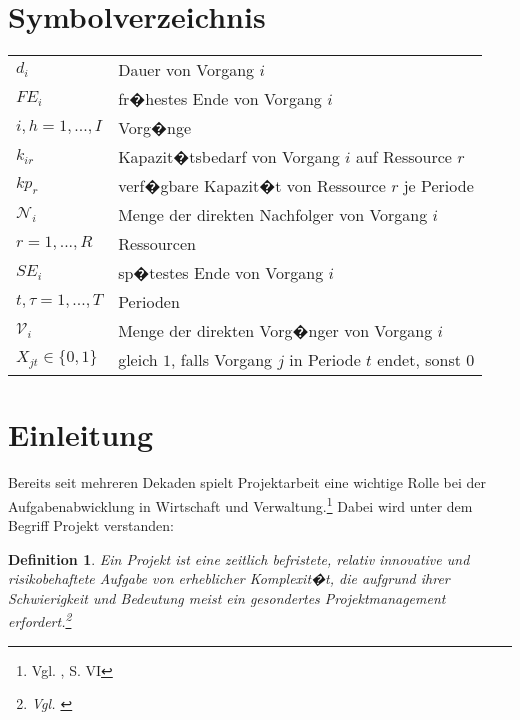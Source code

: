\documentclass[a4paper,12pt,parskip,bibtotoc,liststotoc]{article}
\newtheorem{mydef}{Definition}
\begin{document}
\section*{Symbolverzeichnis}
\begin{table}[h!]
    \vspace*{-3mm}
        \hspace*{2mm}
      \renewcommand{\arraystretch}{1,5}
    \begin{tabular}{ll} 
$d_i$ & Dauer von Vorgang $i$ \\
$FE_i$& fr�hestes Ende von Vorgang $i$\\
$i,h=1,...,I$ & Vorg�nge \\
$k_{ir}$& Kapazit�tsbedarf von Vorgang $i$ auf Ressource $r$\\
$kp_r$ & verf�gbare Kapazit�t von Ressource $r$ je Periode\\
$\mathcal{N}_i$ & Menge der direkten Nachfolger von Vorgang $i$ \\
$r=1,...,R$ & Ressourcen \\
$SE_i$& sp�testes Ende von Vorgang $i$\\
$t,\tau=1,..., T$ & Perioden\\
$\mathcal{V}_i$ & Menge der direkten Vorg�nger von Vorgang $i$ \\
$X_{jt}\in\{0,1\}$ & gleich $1$, falls Vorgang $j$ in Periode $t$ endet, sonst $0$
  	\end{tabular}
\end{table}
\newpage
{}   %


\section{Einleitung} \label{start}
Bereits seit mehreren Dekaden spielt Projektarbeit eine wichtige Rolle bei der Aufgabenabwicklung in Wirtschaft und Verwaltung.\footnote{Vgl. \cite{zimmermann2006projektplanung}, S. VI} Dabei wird unter dem Begriff Projekt verstanden:

\begin{mydef}
\glqq Ein Projekt ist eine zeitlich befristete, relativ innovative und risikobehaftete Aufgabe von erheblicher Komplexit�t, die aufgrund ihrer Schwierigkeit und Bedeutung meist ein gesondertes Projektmanagement erfordert.\grqq\footnote{Vgl. \cite{projektdef}}
\end{mydef}
\end{document}
